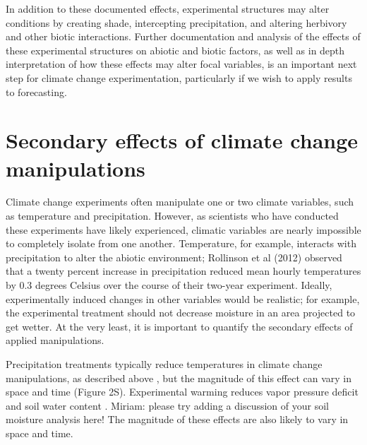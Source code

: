 \documentclass{article}
\begin{document}
\par In addition to these documented effects, experimental structures may alter conditions by creating shade, intercepting precipitation, and altering herbivory and other biotic interactions. Further documentation and analysis of the effects of these experimental structures on abiotic and biotic factors, as well as in depth interpretation of how these effects may alter focal variables, is an important next step for climate change experimentation, particularly if we wish to apply results to forecasting.

\section* {Secondary effects of climate change manipulations}
Climate change experiments often manipulate one or two climate variables, such as temperature and precipitation. However, as scientists who have conducted these experiments have likely experienced, climatic variables are nearly impossible to completely isolate from one another.  Temperature, for example, interacts with precipitation to alter the abiotic environment; Rollinson et al (2012) observed that a twenty percent increase in precipitation reduced mean hourly temperatures by 0.3 degrees Celsius over the course of their two-year experiment. 
Ideally, experimentally induced changes in other variables would be realistic; for example, the experimental treatment should not decrease moisture in an area projected to get wetter. At the very least, it is important to quantify the secondary effects of applied manipulations.  

\par Precipitation treatments typically reduce temperatures in climate change manipulations, as described above \citep[e.g.][]{sherry2007,rollinson2012}, but the magnitude of this effect can vary in space and time (Figure 2S). Experimental warming  reduces vapor pressure deficit and soil water content \citep[e.g. Figure 3S][]{sherry2007,morin2010,templer2016}. Miriam: please try adding a discussion of your soil moisture analysis here! The magnitude of these effects are also likely to vary in space and time. %
\end{document}
